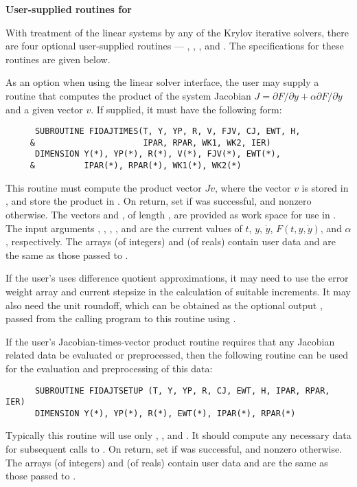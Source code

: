\begin{Steps}

  {\bf User-supplied routines for {\idaspils}}

  With treatment of the linear systems by any of the Krylov iterative
  solvers, there are four optional user-supplied routines ---
  , , , and .
  The specifications for these routines are given below.

  As an option when using the {\idaspils} linear solver interface, the user may
  supply a routine that computes the product of the system Jacobian
  $J = \partial F / \partial y + \alpha \partial F / \partial \dot{y}$
  and a given vector $v$.  If supplied, it must have the following form:
\begin{verbatim}
      SUBROUTINE FIDAJTIMES(T, Y, YP, R, V, FJV, CJ, EWT, H, 
     &                      IPAR, RPAR, WK1, WK2, IER)
      DIMENSION Y(*), YP(*), R(*), V(*), FJV(*), EWT(*), 
     &          IPAR(*), RPAR(*), WK1(*), WK2(*)
\end{verbatim}
  This routine must compute the product vector $Jv$, where the vector $v$ is
  stored in , and store the product in .  On return, set
   if  was successful, and nonzero otherwise.
  The vectors  and , of length , are
  provided as work space for use in .
  The input arguments , , , , and  are the
  current values of $t$, $y$, $\dot{y}$, $F(t,y,\dot{y})$, and $\alpha$, respectively.
  The arrays  (of integers) and  (of reals) contain user data
  and are the same as those passed to .

  If the user's  uses difference quotient approximations, it
  may need to use the error weight array  and current stepsize 
  in the calculation of suitable increments.  It may also need the unit
  roundoff, which can be obtained as the optional output ,
  passed from the calling program to this routine using .

  If the user's Jacobian-times-vector product routine requires that
  any Jacobian related data be evaluated or preprocessed, then the
  following routine can be used for the evaluation and preprocessing
  of this data:
\begin{verbatim}
      SUBROUTINE FIDAJTSETUP (T, Y, YP, R, CJ, EWT, H, IPAR, RPAR, IER)
      DIMENSION Y(*), YP(*), R(*), EWT(*), IPAR(*), RPAR(*)
\end{verbatim}
  Typically this routine will use only , , and .  It should
  compute any necessary data for subsequent calls to .  On return, set
   if  was successful, and nonzero otherwise.
  The arrays  (of integers) and  (of reals) contain user data
  and are the same as those passed to .


\end{Steps}
